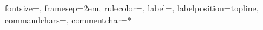 \newcommand{\linline}[2]{#2}
\newcommand{\st}[1]{\sout{#1}}
\renewcommand{\t}[1]{\texttt{#1}}

\makeatletter
\renewcommand*{\u}{\begingroup\@makeother\%\@myhref}
\newcommand*{\@myhref}[2]{\href{#2}{#1}\endgroup}
\makeatother

{}%
{fontsize=\footnotesize,
 framesep=2em, %
 rulecolor=\color{Gray},
 label=,
 labelposition=topline,
 commandchars=\|\(\), %
 commentchar=*        %
}
